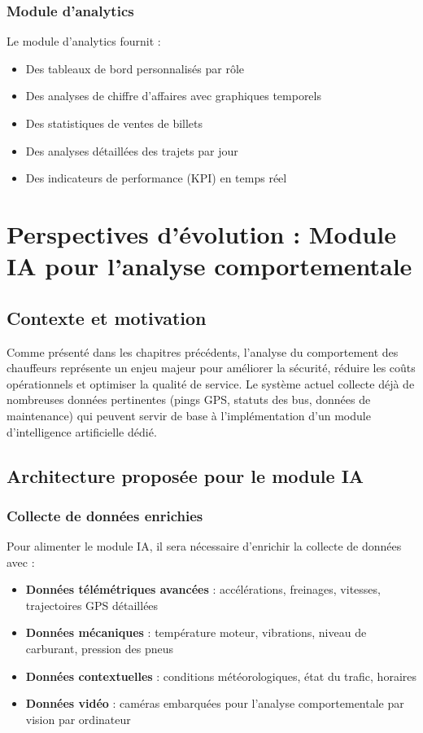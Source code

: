 \documentclass[a4paper, 12pt]{book}
\begin{document}
\subsection{Module d'analytics}

Le module d'analytics fournit :
\begin{itemize}
    \item Des tableaux de bord personnalisés par rôle
    \item Des analyses de chiffre d'affaires avec graphiques temporels
    \item Des statistiques de ventes de billets
    \item Des analyses détaillées des trajets par jour
    \item Des indicateurs de performance (KPI) en temps réel
\end{itemize}

\chapter{Perspectives d'évolution : Module IA pour l'analyse comportementale}

\section{Contexte et motivation}

Comme présenté dans les chapitres précédents, l'analyse du comportement des chauffeurs représente un enjeu majeur pour améliorer la sécurité, réduire les coûts opérationnels et optimiser la qualité de service. Le système actuel collecte déjà de nombreuses données pertinentes (pings GPS, statuts des bus, données de maintenance) qui peuvent servir de base à l'implémentation d'un module d'intelligence artificielle dédié.

\section{Architecture proposée pour le module IA}

\subsection{Collecte de données enrichies}

Pour alimenter le module IA, il sera nécessaire d'enrichir la collecte de données avec :
\begin{itemize}
    \item \textbf{Données télémétriques avancées} : accélérations, freinages, vitesses, trajectoires GPS détaillées
    \item \textbf{Données mécaniques} : température moteur, vibrations, niveau de carburant, pression des pneus
    \item \textbf{Données contextuelles} : conditions météorologiques, état du trafic, horaires
    \item \textbf{Données vidéo} : caméras embarquées pour l'analyse comportementale par vision par ordinateur
\end{itemize}
\end{document}
